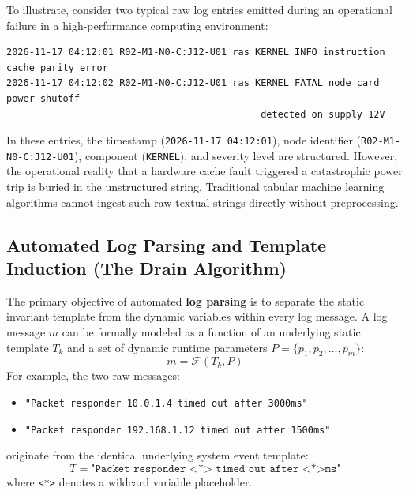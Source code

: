 To illustrate, consider two typical raw log entries emitted during an operational failure in a high-performance computing environment:
\begin{verbatim}
2026-11-17 04:12:01 R02-M1-N0-C:J12-U01 ras KERNEL INFO instruction cache parity error
2026-11-17 04:12:02 R02-M1-N0-C:J12-U01 ras KERNEL FATAL node card power shutoff 
                                             detected on supply 12V
\end{verbatim}

In these entries, the timestamp (\texttt{2026-11-17 04:12:01}), node identifier (\texttt{R02-M1-N0-C:J12-U01}), component (\texttt{KERNEL}), and severity level are structured. However, the operational reality that a hardware cache fault triggered a catastrophic power trip is buried in the unstructured string. Traditional tabular machine learning algorithms cannot ingest such raw textual strings directly without preprocessing.

\subsection{Automated Log Parsing and Template Induction (The Drain Algorithm)}
\label{subsec:drain_parsing}
The primary objective of automated \textbf{log parsing} is to separate the static invariant template from the dynamic variables within every log message. A log message $m$ can be formally modeled as a function of an underlying static template $T_k$ and a set of dynamic runtime parameters $P = \{p_1, p_2, \dots, p_m\}$:
\begin{equation}
    m = \mathcal{F}(T_k, P)
\end{equation}
For example, the two raw messages:
\begin{itemize}
    \item \texttt{"Packet responder 10.0.1.4 timed out after 3000ms"}
    \item \texttt{"Packet responder 192.168.1.12 timed out after 1500ms"}
\end{itemize}
originate from the identical underlying system event template:
\begin{equation}
    T = \texttt{"Packet responder <*> timed out after <*>ms"}
\end{equation}
where \texttt{<*>} denotes a wildcard variable placeholder.

